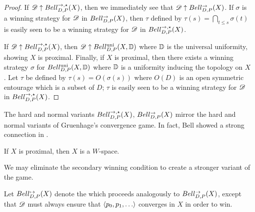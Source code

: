 \begin{proof}
  If $\mathscr{D}\uparrow Bell_{D,P}^{\to,\star}(X)$, then we immediately see that
  $\mathscr{D}\uparrow Bell_{D,P}^{\to}(X)$. If $\sigma$ is a winning strategy for $\mathscr{D}$
  in $Bell_{D,P}^{\to}(X)$, then $\tau$ defined by
  $\tau(s)=\bigcap_{t\leq s}\sigma(t)$ is easily seen to be a winning strategy
  for $\mathscr{D}$ in $Bell_{D,P}^{\to,\star}(X)$.

  If $\mathscr{D}\uparrow Bell_{D,P}^{\to,\star}(X)$, then $\mathscr{D}\uparrow Bell_{D,P}^{\textrm{uni}}(X,\mathbb{D})$
  where $\mathbb{D}$ is the universal uniformity, showing $X$ is proximal.
  Finally, if $X$ is proximal, then there exists a winning strategy $\sigma$
  for $Bell_{D,P}^{\textrm{uni}}(X,\mathbb{D})$ where $\mathbb{D}$ is a uniformity inducing the
  topology on $X$. Let $\tau$ be defined by $\tau(s)=O(\sigma(s))$ where
  $O(D)$ is an open symmetric entourage which is a subset of $D$; $\tau$
  is easily seen to be a winning strategy for $\mathscr{D}$ in $Bell_{D,P}^{\to,\star}(X)$.
\end{proof}

The hard and normal variants $Bell_{D,P}^{\to,\star}(X)$, $Bell_{D,P}^{\to}(X)$ mirror the
hard and normal variants of Gruenhage's convergence game. In fact, Bell
showed a strong connection in \cite{MR3239205}.

\begin{thm}
  If $X$ is proximal, then $X$ is a $W$-space.
\end{thm}




We may eliminate the secondary winning condition to create a stronger
variant of the game.

\begin{defn}
  Let $Bell_{D,P}^{\mapsto}(X)$ denote the
   which
  proceeds analogously to $Bell_{D,P}^{\to}(X)$, except
  that $\mathscr{D}$ must always ensure that $\<p_0,p_1,\dots\>$ converges
  in $X$ in order to win.
\end{defn}

